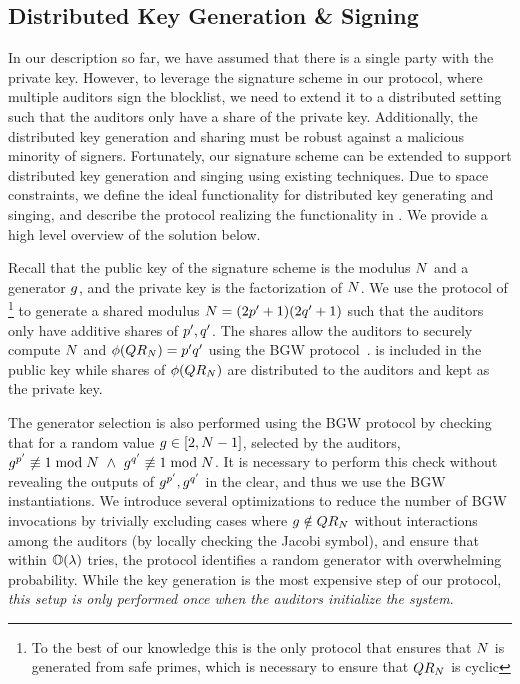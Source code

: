 \subsection{Distributed Key Generation \& Signing}
%
In our description so far, we have assumed that there is a single party with the private key. However, to leverage the signature scheme in our protocol, where multiple auditors sign the blocklist, we need to extend it to a distributed setting such that the auditors only have a share of the private key. Additionally, the distributed key generation and sharing must be robust against a malicious minority of signers. Fortunately, our signature scheme can be extended to support distributed key generation and singing using existing techniques. Due to space constraints, we define the ideal functionality \distSigningFunc for distributed key generating and singing, and describe the protocol realizing the functionality in . We provide a high level overview of the solution below. 

%
Recall that the public key of the signature scheme is the modulus $N$ and a generator $g$, and the private key is the factorization of $N$. We use the protocol of \citet{algesheimer2002efficient}\footnote{To the best of our knowledge this is the only protocol that ensures that $N$ is generated from safe primes, which is necessary to ensure that $QR_{N}$ is cyclic} to generate a shared modulus $\rsaMod = (2 \sgPrime[1] + 1) (2 \sgPrime[2] + 1)$ such that the auditors only have additive shares of $\sgPrime[1], \sgPrime[2]$.  
 The shares allow the auditors to securely compute $N$ and $\orderFn(\qrGroup) = \sgPrime[1] \sgPrime[2]$ using the BGW protocol~\cite{asharov2017full}. \rsaMod is included in the public key while shares of $\phi(QR_{N})$ are distributed to the auditors and kept as the private key. 

The generator selection is also performed using the BGW protocol by checking that for a random value $g \in [2, N -1]$, selected by the auditors, $\qrGen^{\sgPrime[1]} \not \equiv 1 \bmod \rsaMod ~\land ~\qrGen^{\sgPrime[2]} \not \equiv 1 \bmod \rsaMod$. 
It is necessary to perform this check without revealing the outputs of   
$\qrGen^{\sgPrime[1]}, \qrGen^{\sgPrime[2]}$ in the clear, and thus we use the BGW instantiations. We introduce several optimizations to reduce the number of BGW invocations by trivially excluding cases where $g \notin QR_{N}$ without interactions among the auditors (by locally checking the Jacobi symbol), and ensure that within $\mathbb{O}(\lambda)$ tries, the protocol identifies a random generator with overwhelming probability. While the key generation is the most expensive step of our protocol, \emph{this setup is only performed once when the auditors initialize the system}.

